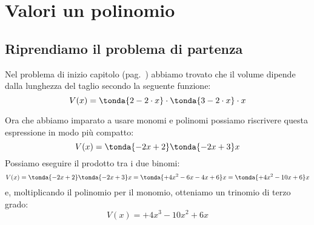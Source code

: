 
\section{Valori un polinomio}
\label{sec:poli_funzione}

\subsection{Riprendiamo il problema di partenza}

Nel problema di inizio capitolo (pag.~\pageref{cartoni}) abbiamo trovato 
che il volume dipende 
dalla lunghezza del taglio secondo la seguente funzione:
\[V(x) = \tonda{2 - 2 \cdot x} \cdot \tonda{3 - 2 \cdot x} \cdot x\]

Ora che abbiamo imparato a usare monomi e polinomi possiamo riscrivere 
questa espressione in modo più compatto:
\[V(x) = \tonda{-2x +2}\tonda{-2x +3}x\]
Possiamo eseguire il prodotto tra i due binomi:
\[V(x) = \tonda{-2x +2}\tonda{-2x +3}x = 
  \tonda{+4x^2-6x-4x+6}x = \tonda{+4x^2-10x+6}x\]
e, moltiplicando il polinomio per il monomio, otteniamo un
trinomio di terzo grado:
\[V(x) = +4x^3 -10x^2 +6x\]


